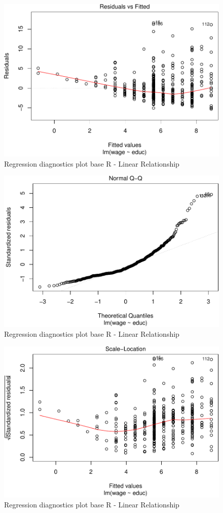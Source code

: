 \documentclass[]{book}
\begin{document}
\begin{figure}

{\centering \includegraphics[width=0.8\linewidth]{MEM5220_R_files/figure-latex/fig12-1} 

}

\caption{Regression diagnostics plot base R - Linear Relationship}\label{fig:fig121}
\end{figure}
\begin{figure}

{\centering \includegraphics[width=0.8\linewidth]{MEM5220_R_files/figure-latex/fig12-2} 

}

\caption{Regression diagnostics plot base R - Linear Relationship}\label{fig:fig122}
\end{figure}
\begin{figure}

{\centering \includegraphics[width=0.8\linewidth]{MEM5220_R_files/figure-latex/fig12-3} 

}

\caption{Regression diagnostics plot base R - Linear Relationship}\label{fig:fig123}
\end{figure}
\end{document}
